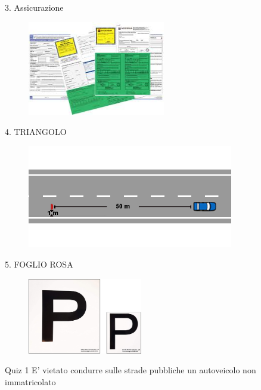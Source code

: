   
  
    
\begin{frame}{3. Assicurazione}
	\begin{figure}[ht!]
    		\centering
         		\includegraphics[width = 6cm]{images/assicurazione.jpg}
    	\end{figure}
\end{frame}       
        
        
        
\begin{frame}{4. TRIANGOLO}
	\begin{figure}[ht!]
    		\centering
         		\includegraphics[width = 9cm]{images/triangolo.jpg}
    	\end{figure}
\end{frame} 

        
                 
\begin{frame}{5. FOGLIO ROSA}
	\begin{figure}[ht!]
    		\centering
         		\includegraphics[width = 5cm]{images/p.jpg}
    	\end{figure}
\end{frame}               
            
    
\begin{frame}{Quiz 1}
	E'   vietato condurre sulle strade pubbliche un
	autoveicolo non immatricolato
     	
     	\quizV
        
\end{frame}
         
